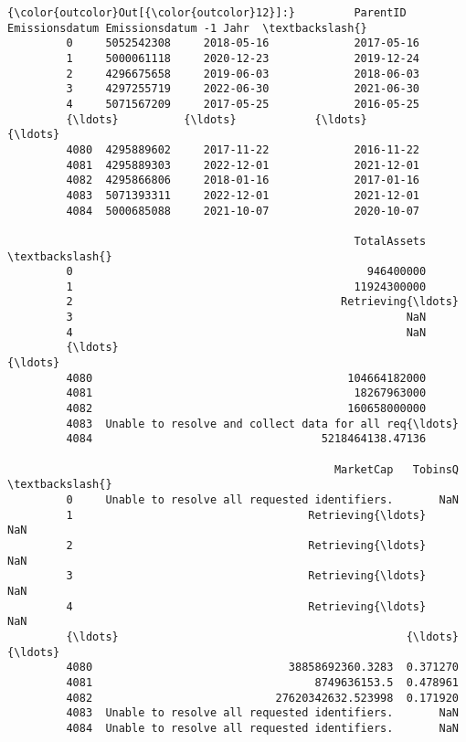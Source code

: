 \documentclass[11pt]{article}
\begin{document}
\begin{Verbatim}[commandchars=\\\{\}]
{\color{outcolor}Out[{\color{outcolor}12}]:}         ParentID Emissionsdatum Emissionsdatum -1 Jahr  \textbackslash{}
         0     5052542308     2018-05-16             2017-05-16   
         1     5000061118     2020-12-23             2019-12-24   
         2     4296675658     2019-06-03             2018-06-03   
         3     4297255719     2022-06-30             2021-06-30   
         4     5071567209     2017-05-25             2016-05-25   
         {\ldots}          {\ldots}            {\ldots}                    {\ldots}   
         4080  4295889602     2017-11-22             2016-11-22   
         4081  4295889303     2022-12-01             2021-12-01   
         4082  4295866806     2018-01-16             2017-01-16   
         4083  5071393311     2022-12-01             2021-12-01   
         4084  5000685088     2021-10-07             2020-10-07   
         
                                                     TotalAssets  \textbackslash{}
         0                                             946400000   
         1                                           11924300000   
         2                                         Retrieving{\ldots}   
         3                                                   NaN   
         4                                                   NaN   
         {\ldots}                                                 {\ldots}   
         4080                                       104664182000   
         4081                                        18267963000   
         4082                                       160658000000   
         4083  Unable to resolve and collect data for all req{\ldots}   
         4084                                   5218464138.47136   
         
                                                  MarketCap   TobinsQ  \textbackslash{}
         0     Unable to resolve all requested identifiers.       NaN   
         1                                    Retrieving{\ldots}       NaN   
         2                                    Retrieving{\ldots}       NaN   
         3                                    Retrieving{\ldots}       NaN   
         4                                    Retrieving{\ldots}       NaN   
         {\ldots}                                            {\ldots}       {\ldots}   
         4080                              38858692360.3283  0.371270   
         4081                                  8749636153.5  0.478961   
         4082                            27620342632.523998  0.171920   
         4083  Unable to resolve all requested identifiers.       NaN   
         4084  Unable to resolve all requested identifiers.       NaN   
         

\end{Verbatim}
\end{document}
